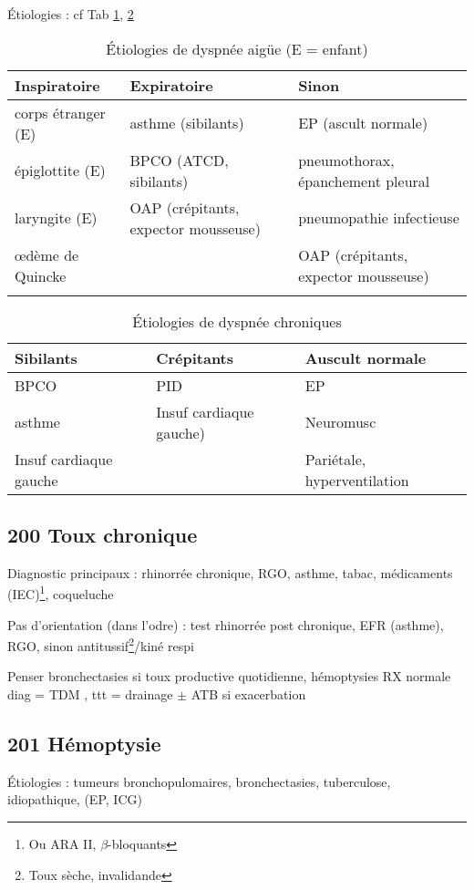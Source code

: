 \documentclass[11pt]{article}
\begin{document}
Étiologies : cf Tab \ref{tab:org5e7fba2}, \ref{tab:org05c3daa}
\begin{table}[htbp]
\caption{\label{tab:org5e7fba2}
Étiologies de dyspnée aigüe (E = enfant)}
\centering
\begin{tabular}{lll}
Inspiratoire & Expiratoire & Sinon\\
\hline
corps étranger (E) & asthme (sibilants) & EP (ascult normale)\\
épiglottite (E) & BPCO (ATCD, sibilants) & pneumothorax, épanchement pleural\\
laryngite (E) & OAP (crépitants, expector mousseuse) & pneumopathie infectieuse\\
\oe{}dème de Quincke &  & OAP (crépitants, expector mousseuse)\\
 &  & \\
\end{tabular}
\end{table}
\begin{table}[htbp]
\caption{\label{tab:org05c3daa}
Étiologies de dyspnée chroniques}
\centering
\begin{tabular}{lll}
Sibilants & Crépitants & Auscult normale\\
\hline
BPCO & PID & EP\\
asthme & Insuf cardiaque gauche) & Neuromusc\\
Insuf cardiaque gauche &  & Pariétale, hyperventilation\\
\end{tabular}
\end{table}

\subsection{200 Toux chronique}
\label{sec:org5ecd3fb}
Diagnostic principaux : rhinorrée chronique, RGO, asthme, tabac, médicaments (IEC)\footnote{Ou ARA II, \(\beta\)-bloquants}, coqueluche

Pas d'orientation (dans l'odre) : test rhinorrée post chronique, EFR (asthme),
RGO, sinon antitussif\footnote{Toux sèche, invalidande}/kiné respi

Penser bronchectasies si toux productive quotidienne, hémoptysies RX normale
\thus diag = TDM , ttt = drainage \(\pm\) ATB si exacerbation
\subsection{201 Hémoptysie}
\label{sec:org00d692c}
Étiologies : tumeurs bronchopulomaires, bronchectasies, tuberculose,
idiopathique, (EP, ICG)
\end{document}

